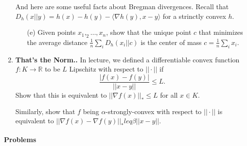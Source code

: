 \documentclass{article}
\theoremstyle{plain}
\newcommand{\R}{\mathbb{R}}
\newcommand\litem[1]{\item{\bfseries#1.\space}}
\begin{document}
\begin{enumerate}
\begin{enumerate}
\end{enumerate}
And here are some useful facts about Bregman divergences. Recall that $D_h(x||y) = h(x) - h(y) - \langle \nabla h(y), x-y\rangle$ for a strinctly convex $h$.
\begin{enumerate}
  \item[(e)] Given points $x_1, _2 \ldots, x_n$, show that the unique point $c$ that minimizes the average distance $\frac{1}{n} \sum_i D_h(x_i || c)$ is the center of mass $c = \frac{1}{n} \sum_i x_i$.
\end{enumerate}
\litem{That's the Norm.} In lecture, we defined a differentiable convex function $f : K \to \R$ to be $L$ Lipschitz with respect to $|| \cdot ||$ if
\[\frac{| f(x) - f(y)|}{||x - y||} \leq L.\]
Show that this is equivalent to $|| \nabla f(x)||_* \leq L$ for all $x\in K$.

Similarly, show that $f$ being $\alpha$-strongly-convex with respect
to $|| \cdot ||$ is equivalent to
$|| \nabla f(x) - \nabla f(y)||_* leq \beta || x - y||$.
\end{enumerate}
\paragraph{Problems}
\end{document}
